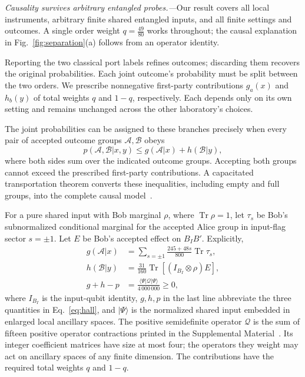 \documentclass[aps,prl,reprint,superscriptaddress,longbibliography,bibnotes,floatfix]{revtex4-2}
\newcommand{\Tr}{\operatorname{Tr}}
\begin{document}
\emph{Causality survives arbitrary entangled probes.---}Our result covers all local instruments, arbitrary finite shared entangled inputs, and all finite settings and outcomes. A single order weight $q=\frac{49}{80}$ works throughout; the causal explanation in Fig.~\ref{fig:separation}(a) follows from an operator identity.

Reporting the two classical port labels refines outcomes; discarding them recovers the original probabilities. Each joint outcome's probability must be split between the two orders. We prescribe nonnegative first-party contributions $g_a(x)$ and $h_b(y)$ of total weights $q$ and $1-q$, respectively. Each depends only on its own setting and remains unchanged across the other laboratory's choices.

The joint probabilities can be assigned to these branches precisely when every pair of accepted outcome groups $\mathcal A,\mathcal B$ obeys
\begin{equation}
 p(\mathcal A,\mathcal B|x,y)
 \le g(\mathcal A|x)+h(\mathcal B|y),
 \label{eq:hall}
\end{equation}
where both sides sum over the indicated outcome groups. Accepting both groups cannot exceed the prescribed first-party contributions. A capacitated transportation theorem converts these inequalities, including empty and full groups, into the complete causal model~\cite{SM}.

For a pure shared input with Bob marginal $\rho$, where $\Tr\rho=1$, let $\tau_s$ be Bob's subnormalized conditional marginal for the accepted Alice group in input-flag sector $s=\pm1$. Let $E$ be Bob's accepted effect on $B_IB'$. Explicitly,
\begin{equation}
\begin{split}
 g(\mathcal A|x)&=\sum_{s=\pm1}\frac{245+48s}{800}\Tr\tau_s,\\
 h(\mathcal B|y)&=\frac{31}{160}\Tr[(I_{B_I}\otimes\rho)E],\\
 g+h-p&=\frac{\langle\Psi|\mathcal Q|\Psi\rangle}{4\,000\,000}\ge0,
\end{split}
\label{eq:positive-gap}
\end{equation}
where $I_{B_I}$ is the input-qubit identity, $g,h,p$ in the last line abbreviate the three quantities in Eq.~\eqref{eq:hall}, and $|\Psi\rangle$ is the normalized shared input embedded in enlarged local ancillary spaces. The positive semidefinite operator $\mathcal Q$ is the sum of fifteen positive operator contractions printed in the Supplemental Material~\cite{SM}. Its integer coefficient matrices have size at most four; the operators they weight may act on ancillary spaces of any finite dimension. The contributions have the required total weights $q$ and $1-q$.
\end{document}
